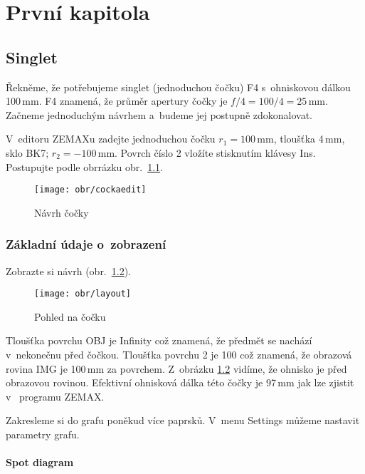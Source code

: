 \chapter{První kapitola}
\label{Prvni}

\section{Singlet}
\label{singlet}

Řekněme, že potřebujeme singlet (jednoduchou čočku) F4 s~ohniskovou dálkou
100\,mm. F4 znamená, že průměr apertury čočky je $f/4=100/4=25$\,mm. Začneme
jednoduchým návrhem a~budeme jej postupně zdokonalovat.

V~editoru ZEMAXu   zadejte jednoduchou čočku $r_1=100$\,mm, tloušťka 4\,mm,
sklo BK7; $r_2=-100$\,mm. Povrch číslo 2 vložíte stisknutím klávesy Ins.
Postupujte podle obrrázku obr.~\ref{cocka}.
%
%
\begin{figure}[htb]
\begin{center}
   \texttt{[image: obr/cockaedit]}
\end{center}
\caption{Návrh čočky}
\label{cocka}
\end{figure}
%
%

\subsection{Základní údaje o~zobrazení}
\label{sing-zakludaje}

Zobrazte si návrh (obr.~\ref{sing-layout}).
%
%
\begin{figure}[htb]
\begin{center}
   \texttt{[image: obr/layout]}
\end{center}
\caption{Pohled na čočku}
\label{sing-layout}
\end{figure}
%
%
Tloušťka povrchu OBJ je Infinity což znamená, že předmět se nachází v~nekonečnu
před čočkou. Tloušťka povrchu 2 je 100 což znamená, že obrazová rovina IMG je
100\,mm za povrchem. Z~obrázku \ref{sing-layout} vidíme, že ohnisko je před
obrazovou rovinou. Efektivní ohnisková dálka této čočky je 97\,mm jak lze
zjistit v~ programu ZEMAX.

Zakresleme si do grafu poněkud více paprsků. V~menu Settings můžeme nastavit
parametry grafu.


\subsubsection{Spot diagram}
\label{sing-spotsub}

